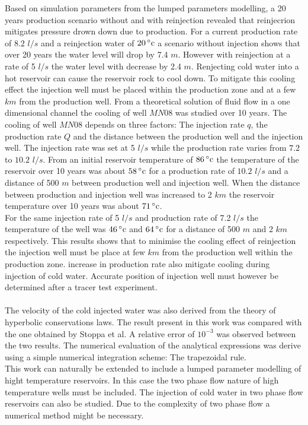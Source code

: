 Based on simulation parameters from the lumped parameters modelling, a 20 years production scenario without and with reinjection revealed that reinjecrion mitigates pressure drown down due to production. For a current production rate of $8.2$ $l/s$ and a reinjection water of $20 \,^{\circ}{\rm c}$ a  scenario without injection shows that over 20 years the water level will drop by 7.4 $m$. However with reinjection at a rate of 5 $l/s$ the water level with decrease by 2.4 $m$. Renjecting cold water into a hot reservoir can cause the reservoir rock to cool down. To mitigate this cooling effect the injection well must be placed within the production zone and at a few $km$ from the production well. From a theoretical solution of fluid flow in a one dimensional channel the cooling of well $MN 08$ was studied over 10 years. The cooling of well $MN 08$ depends on three factors: The injection rate $q$, the production rate $Q$ and the distance between the production well and the injection well.  The injection rate was set at 5 $l/s$ while the production rate varies from $7.2$ to $10.2$ $l/s$. From an initial reservoir temperature of $86 \,^{\circ}{\rm c}$ the temperature of the reservoir over 10 years was about $58\,^{\circ}{\rm c}$ for a production rate of $10.2$ $l/s$ and a distance of 500 $m$ between production well and injection well. When the distance between production and injection well was increased to 2 $km$ the reservoir temperature over 10 years was about $71 \,^{\circ}{\rm c}$.\\
For the same injection rate of 5 $l/s$ and production rate of 7.2 $l/s$ the temperature of the well was $46 \,^{\circ}{\rm c}$ and $64 \,^{\circ}{\rm c}$ for a distance of 500 $m$ and 2 $km$ respectively. This results shows that to minimise the cooling effect of reinjection the injection well must be place at few $km$ from the production well within the production zone. increase in production rate also mitigate cooling during injection of cold water. Accurate position of injection well must however be determined after a tracer test experiment.\\
\\
The velocity of the cold injected water was also derived from the theory of hyperbolic conservations laws. The result present in this  work was compared with the one obtained by Stoppa et al. A relative error of $10^{-3}$ was observed between the two results. The numerical evaluation of the analytical expressions was derive using a simple numerical integration scheme: The trapezoidal rule.\\

This work can naturally be extended to include a lumped parameter modelling of hight temperature reservoirs. In this case the two phase flow nature of high temperature wells must be included. The injection of cold water in two phase flow reservoirs can also be studied. Due to the complexity of two phase flow a numerical method might be necessary. 

